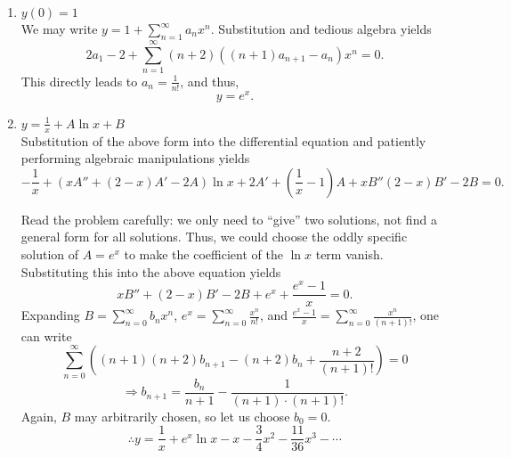 \item
\begin{enumerate}[wide, labelindent = 0pt, label = (\roman*)]
\item $y(0) = 1$ \\
We may write $y = 1 + \sum_{n=1}^\infty a_n x^n$.
Substitution and tedious algebra yields
\[
	2a_1 - 2 + \sum_{n=1}^\infty (n + 2) ((n + 1)a_{n + 1} - a_n) x^n = 0.
\]
This directly leads to $a_n = \frac{1}{n!}$, and thus,
\[
	y = e^x.
\]

\item $y = \frac{1}{x} + A \ln x + B$ \\
Substitution of the above form into the differential equation and patiently performing algebraic manipulations yields
\[
	-\frac{1}{x} + (xA'' + (2 - x)A' - 2A)\ln x + 2A' + \left( \frac{1}{x} - 1 \right) A + xB'' (2 - x) B' - 2B = 0.
\]

Read the problem carefully: we only need to ``give'' two solutions, not find a general form for all solutions.
Thus, we could choose the oddly specific solution of $A = e^x$ to make the coefficient of the $\ln x$ term vanish.
Substituting this into the above equation yields
\[
	xB'' + (2 - x)B' - 2B + e^x + \frac{e^x - 1}{x} = 0.
\]
Expanding $B = \sum_{n=0}^\infty b_n x^n$, $e^x = \sum_{n=0}^\infty \frac{x^n}{n!}$, and $\frac{e^x - 1}{x} = \sum_{n=0}^\infty \frac{x^n}{(n + 1)!}$,
one can write
\[
	\sum_{n=0}^\infty \left(
		(n + 1)(n + 2) b_{n + 1}- (n + 2) b_n + \frac{n + 2}{(n + 1)!}
	\right) = 0
\]
\[
	\Rightarrow b_{n + 1} = \frac{b_n}{n + 1} - \frac{1}{(n + 1) \cdot (n + 1)!}.
\]
Again, $B$ may arbitrarily chosen, so let us choose $b_0 = 0$.
\[
	\therefore y = \frac{1}{x} + e^x \ln x -x - \frac{3}{4}x^2 - \frac{11}{36}x^3 - \cdots
\]
\end{enumerate}